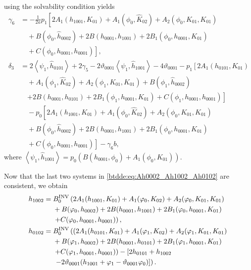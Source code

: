 using the solvability condition yields
\begin{equation*}
\begin{aligned}
\gamma_6 &= -\frac1{2a} p_1 \left[ 2A_1(h_{1001},K_{01}) +
				A_1(\phi_0,\hat K_{02}) + A_2(\phi_0,K_{01},K_{01}) \right. \\
	        & \quad + B(\phi_0,\hat h_{0002}) + 2B(h_{0001},h_{1001}) + 2B_1(\phi_0,h_{0001},K_{01}) \\
            & \left. \quad + C(\phi_0,h_{0001},h_{0001}) \right],  \\
\delta_3 &= 2 \left< \psi_1, \hat h_{0101} \right> + 2 \gamma_5 - 2\vartheta_{0001} \left< \psi_1, \hat h_{1001} \right> 
                - 4\vartheta_{0001} -p_1 \left[ 2A_1(h_{0101},K_{01}) \right. \\ 
            & \quad + A_1(\phi_1,\hat K_{02}) + A_2(\phi_1,K_{01},K_{01}) + B(\phi_1,\hat h_{0002}) \\
            & \quad \left. + 2B(h_{0001},h_{0101}) + 2B_1(\phi_1,h_{0001},K_{01}) +  C(\phi_1,h_{0001},h_{0001}) \right] \\
            & \quad - p_0 \left[ 2A_1(h_{1001},K_{01}) + A_1(\phi_0,\hat K_{02}) +
            A_2(\phi_0,K_{01},K_{01}) \right. \\ 
            & \quad + B(\phi_0,\hat h_{0002}) + 2B(h_{0001},h_{1001}) + 2B_1(\phi_0,h_{0001},K_{01}) \\
            & \left. \quad + C(\phi_0,h_{0001},h_{0001}) \right] - \gamma_6 b,
\end{aligned}
\end{equation*}
where $\left< \psi_1, \hat h_{1001} \right> = p_0 \left( B(h_{0001},\phi_0) + A_1(\phi_0,K_{01}) \right)$.

Now that the last two systems in \cref{btdde:eq:Ah0002_Ah1002_Ah0102} are consistent,
we obtain
\begin{equation*}
\begin{aligned}
h_{1002} ={}& B^{\mathrm{INV}}_{0} \left( 2A_1(h_{1001},K_{01}) + A_1(\varphi_0,K_{02}) + A_2(\varphi_0,K_{01},K_{01}) \right.
					 \\ & + B(\varphi_0,h_{0002}) + 2B(h_{0001},h_{1001}) +
					 2B_1(\varphi_0,h_{0001},K_{01}) \\
  & \left. + C(\varphi_0,h_{0001},h_{0001}) \right), \\
h_{0102} ={}& B^{\mathrm{INV}}_{0} \left(\left( 2A_1(h_{0101},K_{01}) + A_1(\varphi_1,K_{02}) + A_2(\varphi_1,K_{01},K_{01}) \right.\right. \\
  & + B(\varphi_1,h_{0002}) + 2B(h_{0001},h_{0101}) + 2B_1(\varphi_1,h_{0001},K_{01}) \\
  & \left. + C(\varphi_1,h_{0001},h_{0001})\right) - \left[ 2h_{0101} + h_{1002} \right. \\
  & \left.\left. -2\vartheta_{0001} (h_{1001} + \varphi_1 - \vartheta_{0001}\varphi_0) \right]\right).
\end{aligned}
\end{equation*}

